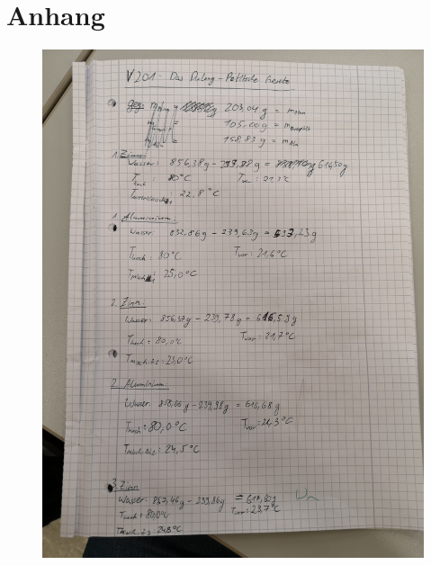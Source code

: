 \newpage
\section{Anhang}
\label{sec:anhang}

\begin{figure}
    \centering
    \includegraphics[scale=0.38]{content/Bilder/Daten1.jpg}
\end{figure}
